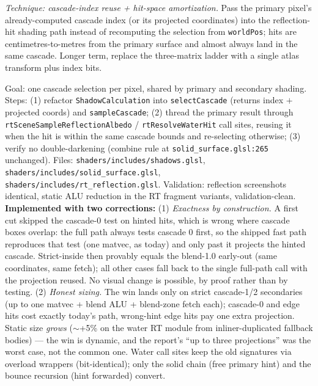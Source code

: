 \documentclass[11pt,a4paper]{article}
\begin{document}
\textit{Technique: cascade-index reuse + hit-space amortization.} Pass the
primary pixel's already-computed cascade index (or its projected coordinates)
into the reflection-hit shading path instead of recomputing the selection from
\texttt{worldPos}; hits are centimetres-to-metres from the primary surface and
almost always land in the same cascade. Longer term, replace the three-matrix
ladder with a single atlas transform plus index bits.

\begin{tcolorbox}[promptbox={Prompt --- H6: reuse the primary cascade decision in secondary hits}]
Goal: one cascade selection per pixel, shared by primary and secondary
shading. Steps: (1) refactor \texttt{ShadowCalculation} into
\texttt{selectCascade} (returns index $+$ projected coords) and
\texttt{sampleCascade}; (2) thread the primary result through
\texttt{rtSceneSampleReflectionAlbedo} / \texttt{rtResolveWaterHit} call
sites, reusing it when the hit is within the same cascade bounds and
re-selecting otherwise; (3) verify no double-darkening (combine rule at
\texttt{solid\_surface.glsl:265} unchanged). Files:
\texttt{shaders/includes/shadows.glsl},
\texttt{shaders/includes/solid\_surface.glsl},
\texttt{shaders/includes/rt\_reflection.glsl}. Validation: reflection
screenshots identical, static ALU reduction in the RT fragment variants,
validation-clean.
\\ \textbf{Implemented with two corrections:} (1) \emph{Exactness by
construction.} A first cut skipped the cascade-0 test on hinted hits, which
is wrong where cascade boxes overlap: the full path always tests cascade 0
first, so the shipped fast path reproduces that test (one matvec, as today)
and only past it projects the hinted cascade. Strict-inside then provably
equals the blend-1.0 early-out (same coordinates, same fetch); all other
cases fall back to the single full-path call with the projection reused.
No visual change is possible, by proof rather than by testing. (2)
\emph{Honest sizing.} The win lands only on strict cascade-1/2 secondaries
(up to one matvec + blend ALU + blend-zone fetch each); cascade-0 and edge
hits cost exactly today's path, wrong-hint edge hits pay one extra
projection. Static size \emph{grows} ($\sim$+5\% on the water RT module from
inliner-duplicated fallback bodies) --- the win is dynamic, and the report's
``up to three projections'' was the worst case, not the common one. Water
call sites keep the old signatures via overload wrappers (bit-identical);
only the solid chain (free primary hint) and the bounce recursion (hint
forwarded) convert.
\end{tcolorbox}
\end{document}
